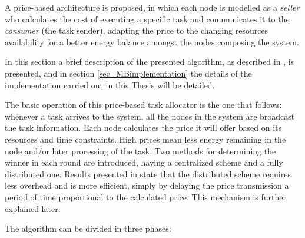 A price-based architecture is proposed, in which each node is modelled as a \emph{seller} who calculates the cost of executing a specific task and communicates it to the \emph{consumer} (the task sender), adapting the price to the changing resources availability for a better energy balance amongst the nodes composing the system.%

In this section a brief description of the presented algorithm, as described in \cite{Edalat09}, is presented, and in section \ref{sec_MBimplementation} the details of the implementation carried out in this Thesis will be detailed.

The basic operation of this price-based task allocator is the one that follows: whenever a task arrives to the system, all the nodes in the system are broadcast the task information. Each node calculates the price it will offer based on its resources and time constraints. High prices mean less energy remaining in the node and/or later processing of the task. Two methods for determining the winner in each round are introduced, having a centralized scheme and a fully distributed one. Results presented in \cite{Edalat09} state that the distributed scheme requires less overhead and is more efficient, simply by delaying the price transmission a period of time proportional to the calculated price. This mechanism is further explained later.

The algorithm can be divided in three phases:

